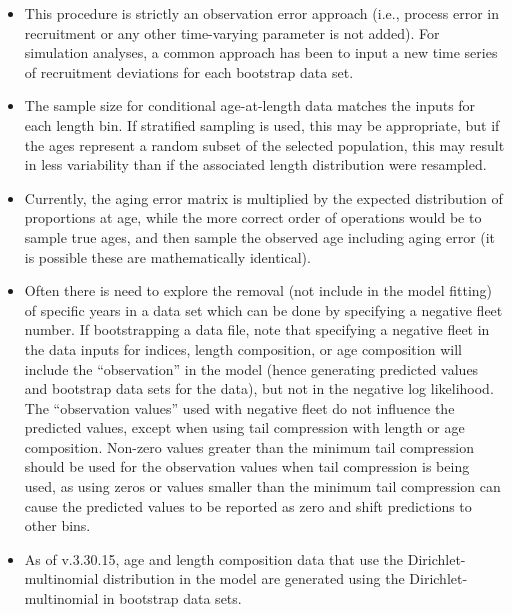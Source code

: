 \begin{itemize}

	\item This procedure is strictly an observation error approach (i.e., process error in recruitment or any other time-varying parameter is not added). For simulation analyses, a common approach has been to input a new time series of recruitment deviations for each bootstrap data set.
	
	\item The sample size for conditional age-at-length data matches the inputs for each length bin. If stratified sampling is used, this may be appropriate, but if the ages represent a random subset of the selected population, this may result in less variability than if the associated length distribution were resampled.
	
	\item Currently, the aging error matrix is multiplied by the expected distribution of proportions at age, while the more correct order of operations would be to sample true ages, and then sample the observed age including aging error (it is possible these are mathematically identical).
	
	\item Often there is need to explore the removal (not include in the model fitting) of specific years in a data set which can be done by specifying a negative fleet number. If bootstrapping a data file, note that specifying a negative fleet in the data inputs for indices, length composition, or age composition will include the ``observation'' in the model (hence generating predicted values and bootstrap data sets for the data), but not in the negative log likelihood. The ``observation values'' used with negative fleet do not influence the predicted values, except when using tail compression with length or age composition. Non-zero values greater than the minimum tail compression should be used for the observation values when tail compression is being used, as using zeros or values smaller than the minimum tail compression can cause the predicted values to be reported as zero and shift predictions to other bins.
	
	\item As of v.3.30.15, age and length composition data that use the Dirichlet-multinomial distribution in the model are generated using the Dirichlet-multinomial in bootstrap data sets.
	
\end{itemize}

